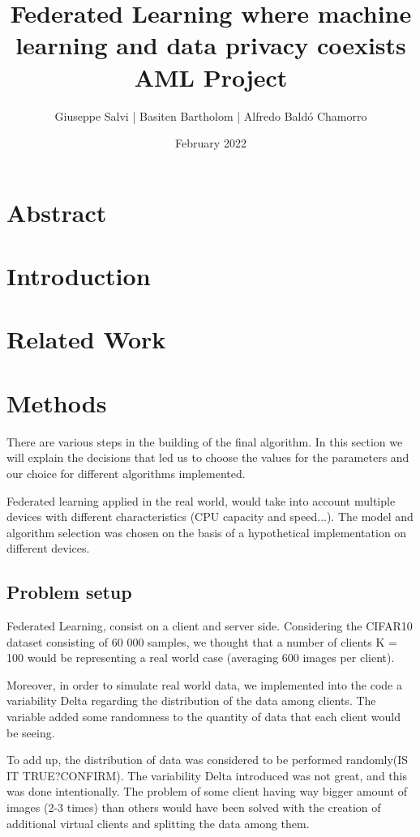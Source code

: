 \documentclass[twocolumn]{article}
\title{Federated Learning where machine learning and data privacy coexists
\\AML Project}
\author{Giuseppe Salvi |
Basiten Bartholom |
Alfredo Baldó Chamorro}
\date{February 2022}
\begin{document}
\maketitle

\section{Abstract}
\section{Introduction} %
\section{Related Work} %
\section{Methods} %
There are various steps in the building of the final algorithm. In this section we will explain the decisions that led us to choose the values for the parameters and our choice for different algorithms implemented. 

Federated learning applied in the real world, would take into account multiple devices with different characteristics (CPU capacity and speed...). The model and algorithm selection was chosen on the basis of a hypothetical implementation on different devices.  

\subsection{Problem setup}
Federated Learning, consist on a client and server side. Considering the CIFAR10 dataset consisting of 60 000 samples, we thought that a number of clients K = 100 would be representing a real world case (averaging 600 images per client). 

Moreover, in order to simulate real world data, we implemented into the code a variability Delta regarding the distribution of the data among clients. The variable added some randomness to the quantity of data that each client would be seeing. 

To add up, the distribution of data was considered to be performed randomly(IS IT TRUE?CONFIRM). The variability Delta introduced was not great, and this was done intentionally. The problem of some client having way bigger amount of images (2-3 times) than others would have been solved with the creation of additional virtual clients and splitting the data among them. 
\end{document}
